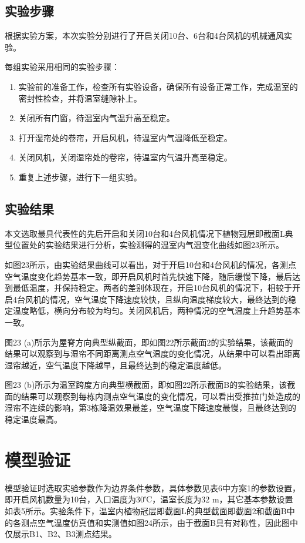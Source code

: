\begin{enumerate}
\begin{enumerate}
	\subsection{实验步骤}
	根据实验方案，本次实验分别进行了开启关闭10台、6台和4台风机的机械通风实验。
	
每组实验采用相同的实验步骤：
	\begin{enumerate}
		\item 实验前的准备工作，检查所有实验设备，确保所有设备正常工作，完成温室的密封性检查，并将温室缝隙补上。
		\item 关闭所有门窗，待温室内气温升高至稳定。
		\item 打开湿帘处的卷帘，开启风机，待温室内气温降低至稳定。
		\item 关闭风机，关闭湿帘处的卷帘，待温室内气温升高至稳定。
		\item 重复上述步骤，进行下一组实验。
	\end{enumerate}
	
	\subsection{实验结果}
	本文选取最具代表性的先后开启和关闭10台和4台风机情况下植物冠层即截面L典型位置处的实验结果进行分析，实验测得的温室内气温变化曲线如图23所示。
	
	如图23所示，由实验结果曲线可以看出，对于开启10台和4台风机的情况，各测点空气温度变化趋势基本一致，即开启风机时首先快速下降，随后缓慢下降，最后达到最低温度，并保持稳定。两者的差别体现在，开启10台风机的情况下，相较于开启4台风机的情况，空气温度下降速度较快，且纵向温度梯度较大，最终达到的稳定温度略低，横向分布较为均匀。关闭风机后，两种情况的空气温度上升趋势基本一致。
	
图23 (a)所示为屋脊方向典型纵截面，即如图22所示截面2的实验结果，该截面的结果可以观察到与湿帘不同距离测点空气温度的变化情况，从结果中可以看出距离湿帘越近，空气温度下降越早，且最终达到的稳定温度越低。

图23 (b)所示为温室跨度方向典型横截面，即如图22所示截面B的实验结果，该截面的结果可以观察到每栋内测点空气温度的变化情况，可以看出受推拉门处造成的湿帘不连续的影响，第3栋降温效果最差，空气温度下降速度最慢，且最终达到的稳定温度最高。

\section{模型验证}
模型验证时选取实验参数作为边界条件参数，具体参数见表6中方案1的参数设置，即开启风机数量为10台，入口温度为30℃，温室长度为32 m，其它基本参数设置如表5所示。实验条件下，温室内植物冠层即截面L的典型截面即截面2和截面B中的各测点空气温度仿真值和实测值如图24所示，由于截面B具有对称性，因此图中仅展示B1、B2、B3测点结果。


\end{enumerate}
\end{enumerate}
